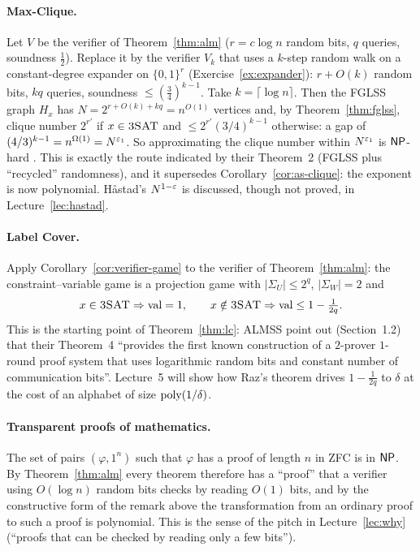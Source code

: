 \paragraph{Max-Clique.}  Let $V$ be the verifier of Theorem~\ref{thm:alm} ($r=c\log n$ random bits, $q$ queries, soundness $\tfrac12$).  Replace it by the verifier $V_k$ that uses a $k$-step random walk on a constant-degree expander on $\{0,1\}^r$
(Exercise~\ref{ex:expander}): $r+O(k)$ random bits, $kq$ queries, soundness $\le(\tfrac34)^{k-1}$.  Take $k=\lceil\log n\rceil$.  Then the FGLSS graph $H_x$ has $N=2^{r+O(k)+kq}=n^{O(1)}$ vertices and, by Theorem~\ref{thm:fglss}, clique number $2^{r'}$ if $x\in\textsc{3SAT}$ and $\le2^{r'}(3/4)^{k-1}$ otherwise:
a gap of $(4/3)^{k-1}=n^{\Omega(1)}=N^{\varepsilon_1}$.  So approximating the clique number within $N^{\varepsilon_1}$ is $\mathsf{NP}$-hard \citep[Theorem~6]{ALMSS98}.  This is exactly the route indicated by their Theorem~2 (FGLSS plus ``recycled'' randomness),
and it supersedes Corollary~\ref{cor:as-clique}: the exponent is now polynomial.  H\aa stad's $N^{1-\varepsilon}$ \citep{Hastad99} is discussed, though not proved, in Lecture~\ref{lec:hastad}.

\paragraph{Label Cover.}  Apply Corollary~\ref{cor:verifier-game} to the verifier of Theorem~\ref{thm:alm}: the constraint--variable game is a projection game with $|\Sigma_U|\le2^q$, $|\Sigma_W|=2$ and
\[
  x\in\textsc{3SAT}\Rightarrow\operatorname{val}=1,\qquad x\notin\textsc{3SAT}\Rightarrow\operatorname{val}\le1-\tfrac1{2q}.
\]
This is the starting point of Theorem~\ref{thm:lc}: ALMSS point out (Section~1.2) that their Theorem~4 ``provides the first known construction of a $2$-prover $1$-round proof system that uses logarithmic random bits and constant number of communication bits''.
Lecture~5 will show how Raz's theorem drives $1-\frac1{2q}$ to $\delta$ at the cost of an alphabet of size $\operatorname{poly}(1/\delta)$.

\paragraph{Transparent proofs of mathematics.}  The set of pairs $(\varphi,1^n)$ such that $\varphi$ has a proof of length $n$ in ZFC is in $\mathsf{NP}$.  By Theorem~\ref{thm:alm} every theorem therefore has a ``proof'' that a verifier using $O(\log n)$ random bits checks by reading $O(1)$ bits, and by the constructive form of the remark above the transformation from an ordinary proof to such a proof is polynomial.
This is the sense of the pitch in Lecture~\ref{lec:why} (``proofs that can be checked by reading only a few bits'').



